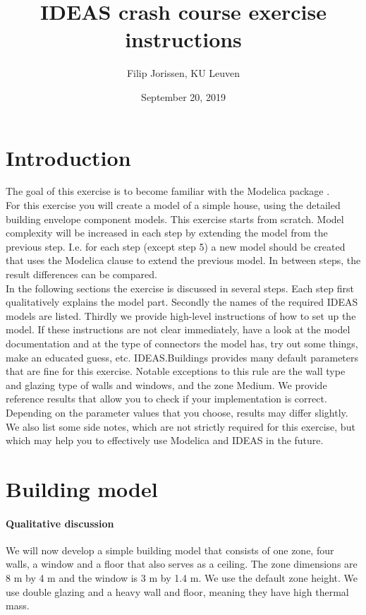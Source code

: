 \documentclass[10pt,a4paper]{article}
\begin{document}
\title{IDEAS crash course exercise instructions}
\author{Filip Jorissen, KU Leuven}
\date{September 20, 2019}
\maketitle

\section*{Introduction}
The goal of this exercise is to become familiar with the 
Modelica package . \\

For this exercise you will create a model of a simple house,
using the detailed building envelope component models.
This exercise starts from scratch. 
Model complexity will be increased in each step by 
extending the model from the previous step. 
I.e. for each step (except step 5) a new model should be created that uses
the Modelica  clause to extend the previous model.
In between steps, the result differences can be compared.\\


In the following sections the exercise is discussed 
in several steps. 
Each step first qualitatively explains the model part.
Secondly the names of the required IDEAS models 
are listed.
Thirdly we provide high-level instructions of how to
set up the model.
If these instructions are not clear immediately, 
have a look at the model documentation and at the type of
connectors the model has, 
try out some things, 
make an educated guess, etc.
IDEAS.Buildings provides many default parameters that are fine for
this exercise. Notable exceptions to this rule are
the wall type and glazing type of walls and windows, and the zone Medium.
We provide reference results that allow you to check
if your implementation is correct. 
Depending on the parameter values that you choose, results
may differ slightly.
We also list some side notes, which are not strictly required for this
exercise, but which may help you to effectively use Modelica
and IDEAS in the future.

\section{Building  model}
\paragraph{Qualitative discussion}
We will now develop a simple building model that consists of one zone,
four walls, a window and a floor that also serves as a ceiling.
The zone dimensions are 8 m by 4 m and the window is 3 m by 1.4 m. We use the default zone height.
We use double glazing and a heavy wall and floor, meaning they
have high thermal mass.
\end{document}
